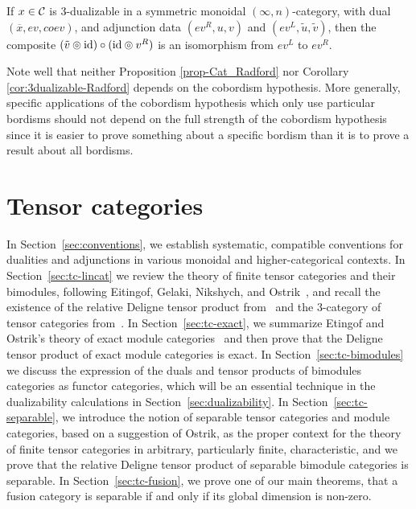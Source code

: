 \documentclass{amsart}
\begin{document}
\begin{corollary} \label{cor:3dualizable-Radford}
If $x \in \mathcal C$ is 3-dualizable in a symmetric monoidal $(\infty,n)$-category, with dual $(\overline{x}, ev, coev)$, and adjunction data $(ev^R, u, v)$ and $(ev^L, \tilde{u}, \tilde{v})$, then the composite $(\tilde{v} \circledcirc \mathrm{id}) \circ (\mathrm{id} \circledcirc v^R)$ is an isomorphism from $ev^L$ to $ev^R$.
\end{corollary}

\nid Note well that neither Proposition \ref{prop-Cat_Radford} nor Corollary \ref{cor:3dualizable-Radford} depends on the cobordism hypothesis.  More generally, specific applications of the cobordism hypothesis which only use particular bordisms should not depend on the full strength of the cobordism hypothesis since it is easier to prove something about a specific bordism than it is to prove a result about all bordisms.  


\section{Tensor categories} \label{sec:tc}

In Section~\ref{sec:conventions}, we establish systematic, compatible conventions for dualities and adjunctions in various monoidal and higher-categorical contexts.  In Section~\ref{sec:tc-lincat} we review the theory of finite tensor categories and their bimodules, following Eitingof, Gelaki, Nikshych, and Ostrik~\cite{MR1976459,MR2183279,MR2097289, 0909.3140, EGNO}, and recall the existence of the relative Deligne tensor product from~\cite{BTP} and the 3-category of tensor categories from~\cite{3TC}.  In Section~\ref{sec:tc-exact}, we summarize Etingof and Ostrik's theory of exact module categories~\cite{EO-ftc} and then prove that the Deligne tensor product of exact module categories is exact.  In Section~\ref{sec:tc-bimodules} we discuss the expression of the duals and tensor products of bimodules categories as functor categories, which will be an essential technique in the dualizability calculations in Section~\ref{sec:dualizability}.  In Section~\ref{sec:tc-separable}, we introduce the notion of separable tensor categories and module categories, based on a suggestion of Ostrik, as the proper context for the theory of finite tensor categories in arbitrary, particularly finite, characteristic, and we prove that the relative Deligne tensor product of separable bimodule categories is separable.  In Section~\ref{sec:tc-fusion}, we prove one of our main theorems, that a fusion category is separable if and only if its global dimension is non-zero.
\end{document}

